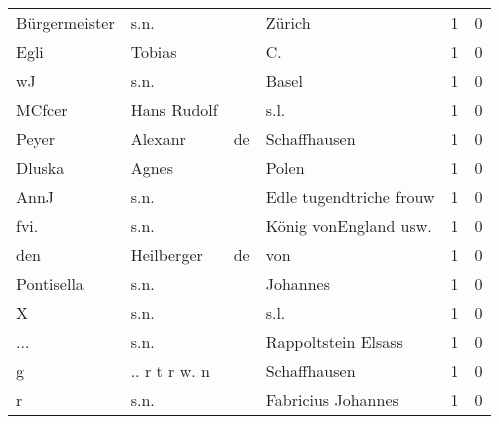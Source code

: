 \begin{tabular}{llllrr}
            Bürgermeister &                               s.n. &             &                                      Zürich &          1 &         0 \\
                     Egli &                             Tobias &             &                                         C.  &          1 &         0 \\
                       wJ &                               s.n. &             &                                       Basel &          1 &         0 \\
                   MCfcer &                        Hans Rudolf &             &                                        s.l. &          1 &         0 \\
                    Peyer &                            Alexanr &          de &                                Schaffhausen &          1 &         0 \\
                   Dluska &                              Agnes &             &                                       Polen &          1 &         0 \\
                     AnnJ &                               s.n. &             &                     Edle tugendtriche frouw &          1 &         0 \\
                     fvi. &                               s.n. &             &                      König vonEngland usw.  &          1 &         0 \\
                      den &                         Heilberger &          de &                                         von &          1 &         0 \\
               Pontisella &                               s.n. &             &                                    Johannes &          1 &         0 \\
                        X &                               s.n. &             &                                        s.l. &          1 &         0 \\
                      ... &                               s.n. &             &                         Rappoltstein Elsass &          1 &         0 \\
                        g &                      .. r t r w. n &             &                                Schaffhausen &          1 &         0 \\
                        r &                               s.n. &             &                          Fabricius Johannes &          1 &         0 \\

\end{tabular}
